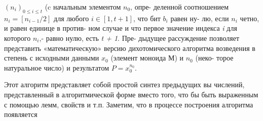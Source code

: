 \noindent $(n_{i})_{0 \leqslant i \leqslant t}$ (c начальным элементом $n_{0}$, опре-\linebreak
деленной соотношением $n_{i} = [n_{i-1} / 2]$ для \linebreak
любого \textit{$i \in [1,t + 1]$}, что бит $b_{i}$ равен ну-\linebreak
лю, если $n_{i}$ четно, и равен единице в против­-\linebreak
ном случае и что первое значение индекса \textit{i} \linebreak
для которого \textit{$n_{i}$},- равно нулю, есть \textit{t + 1}. Пре­-\linebreak
дыдущее рассуждение позволяет представить\linebreak
«математическую» версию дихотомического\linebreak
алгоритма возведения в степень с исходными\linebreak
данными $x_{0}$ (элемент моноида М) и $n_{0}$ (неко­-\linebreak
торое натуральное число) и результатом \textit{$P = x_{0}^{n_{0}}$}.
\newline

Этот алгоритм представляет собой простой синтез предыдущих вы­
числений, представленный в алгоритмической форме вместо того, что­
бы быть выраженным с помощью лемм, свойств и т.п. Заметим, что в процессе построения алгоритма появляется
\pagebreak

